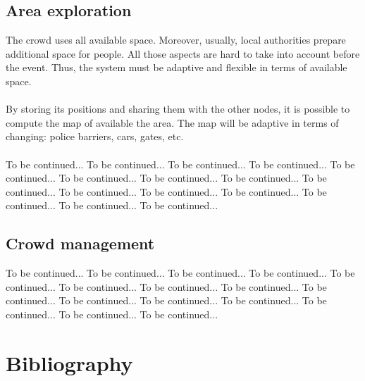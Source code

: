 \documentclass[12pt,a4paper]{report}
\begin{document}
\section*{Area exploration}
The crowd uses all available space. Moreover, usually, local authorities prepare additional space for people. All those aspects are hard to take into account before the event. Thus, the system must be adaptive and flexible in terms of available space. \\\\
By storing its positions and sharing them with the other nodes, it is possible to compute the map of available the area. The map will be adaptive in terms of changing: police barriers, cars, gates, etc.\\\\
To be continued...  To be continued...  To be continued...  To be continued...  To be continued...  To be continued...  To be continued...  To be continued...  To be continued...  To be continued...  To be continued...  To be continued...  To be continued...  To be continued...  To be continued...  

\section*{Crowd management}
To be continued...  To be continued...  To be continued...  To be continued...  To be continued...  To be continued...  To be continued...  To be continued...  To be continued...  To be continued...  To be continued...  To be continued...  To be continued...  To be continued...  To be continued...  










\chapter*{Bibliography}
\end{document}
